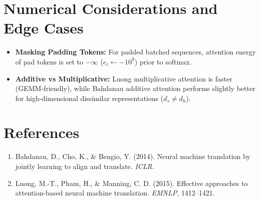 \documentclass[11pt,a4paper]{article}
\theoremstyle{definition}
\begin{document}
\section{Numerical Considerations and Edge Cases}

\begin{itemize}
    \item \textbf{Masking Padding Tokens:} For padded batched sequences, attention energy of pad tokens is set to $-\infty$ ($e_i \gets -10^9$) prior to softmax.
    \item \textbf{Additive vs Multiplicative:} Luong multiplicative attention is faster (GEMM-friendly), while Bahdanau additive attention performs slightly better for high-dimensional dissimilar representations ($d_s \ne d_h$).
\end{itemize}

\section{References}
\begin{enumerate}
    \item Bahdanau, D., Cho, K., & Bengio, Y. (2014). Neural machine translation by jointly learning to align and translate. \emph{ICLR}.
    \item Luong, M.-T., Pham, H., & Manning, C. D. (2015). Effective approaches to attention-based neural machine translation. \emph{EMNLP}, 1412--1421.
\end{enumerate}
\end{document}
